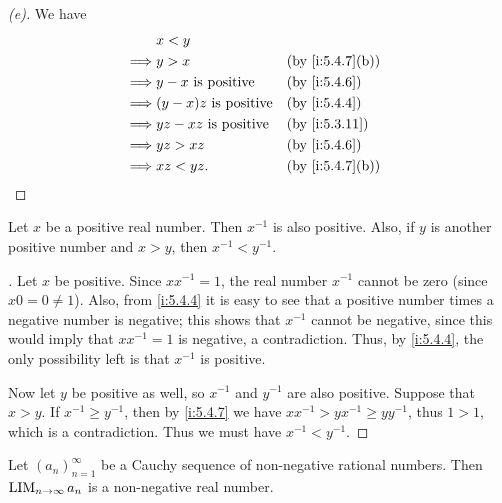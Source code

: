 \begin{proof}[(e)]
  We have
  \begin{align*}
             & x < y                                             \\
    \implies & y > x                        &  & \by{i:5.4.7}[b] \\
    \implies & y - x \text{ is positive}    &  & \by{i:5.4.6}    \\
    \implies & (y - x)z \text{ is positive} &  & \by{i:5.4.4}    \\
    \implies & yz - xz \text{ is positive}  &  & \by{i:5.3.11}   \\
    \implies & yz > xz                      &  & \by{i:5.4.6}    \\
    \implies & xz < yz.                     &  & \by{i:5.4.7}[b]
  \end{align*}
\end{proof}

\begin{prop}\label{i:5.4.8}
  Let \(x\) be a positive real number.
  Then \(x^{-1}\) is also positive.
  Also, if \(y\) is another positive number and \(x > y\), then \(x^{-1} < y^{-1}\).
\end{prop}

\begin{proof}[]
  Let \(x\) be positive.
  Since \(xx^{-1} = 1\), the real number \(x^{-1}\) cannot be zero (since \(x0 = 0 \neq 1\)).
  Also, from \cref{i:5.4.4} it is easy to see that a positive number times a negative number is negative;
  this shows that \(x^{-1}\) cannot be negative, since this would imply that \(xx^{-1} = 1\) is negative, a contradiction.
  Thus, by \cref{i:5.4.4}, the only possibility left is that \(x^{-1}\) is positive.

  Now let \(y\) be positive as well, so \(x^{-1}\) and \(y^{-1}\) are also positive.
  Suppose that \(x > y\).
  If \(x^{-1} \geq y^{-1}\), then by \cref{i:5.4.7} we have \(xx^{-1} > yx^{-1} \geq yy^{-1}\), thus \(1 > 1\), which is a contradiction.
  Thus we must have \(x^{-1} < y^{-1}\).
\end{proof}

\begin{prop}\label{i:5.4.9}
  Let \((a_n)_{n = 1}^\infty\) be a Cauchy sequence of non-negative rational numbers.
  Then \(\operatorname*{LIM}_{n \to \infty} a_n\) is a non-negative real number.
\end{prop}

